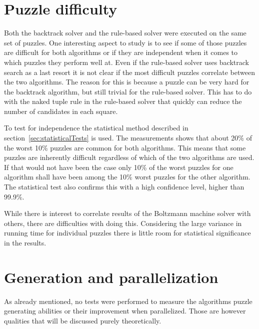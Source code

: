 \documentclass[a4paper,11pt]{kth-mag}
\begin{document}
\FloatBarrier
\section{Puzzle difficulty}
\label{sec:difficultyAnalysis}
Both the backtrack solver and the rule-based solver were executed on the same set of puzzles.
One interesting aspect to study is to see if some of those puzzles are difficult for both algorithms or if they are independent when it comes to which puzzles they perform well at.
Even if the rule-based solver uses backtrack search as a last resort it is not clear if the most difficult puzzles correlate between the two algorithms.
The reason for this is because a puzzle can be very hard for the backtrack algorithm, but still trivial for the rule-based solver. 
This has to do with the naked tuple rule in the rule-based solver that quickly can reduce the number of candidates in each square.

To test for independence the statistical method described in section~\ref{sec:statisticalTests} is used.
The measurements shows that about 20\% of the worst 10\% puzzles are common for both algorithms. 
This means that some puzzles are inherently difficult regardless of which of the two algorithms are used.
If that would not have been the case only 10\% of the worst puzzles for one algorithm shall have been among the 10\% worst puzzles for the other algorithm.
The statistical test also confirms this with a high confidence level, higher than 99.9\%.

While there is interest to correlate results of the Boltzmann machine solver with others, there are difficulties with doing this.
Considering the large variance in running time for individual puzzles there is little room for statistical significance in the results.

\section{Generation and parallelization}
\label{sec:generation}
As already mentioned, no tests were performed to measure the algorithms puzzle generating abilities or their improvement when parallelized.
Those are however qualities that will be discussed purely theoretically.
\end{document}
